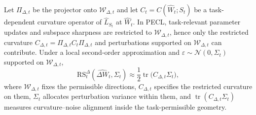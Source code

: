\documentclass{article}
\theoremstyle{plain}
\theoremstyle{definition}
\theoremstyle{remark}
\begin{document}
Let $\Pi_{\Delta,t}$ be the projector onto $\mathcal W_{\Delta,t}$ and let $C_t=C(\hat W_t;S_t)$ be a task-dependent curvature operator of $\hat L_{S_t}$ at $\widehat W_t$.
In PECL, task-relevant parameter updates and subspace sharpness are restricted to $\mathcal W_{\Delta,t}$, hence only the restricted curvature $C_{\Delta,t}=\Pi_{\Delta,t}C_t\Pi_{\Delta,t}$ and perturbations supported on $\mathcal W_{\Delta,t}$ can contribute.
Under a local second-order approximation and $\varepsilon\sim\mathcal N(0,\Sigma_t)$ supported on $\mathcal W_{\Delta,t}$,
{%
\[
\mathrm{RS}_t^{\Delta}(\widehat{\Delta W}_t,\Sigma_t)
\approx
\frac12\operatorname{tr}\!\big(C_{\Delta,t}\Sigma_t\big),
\]
}where $\mathcal W_{\Delta,t}$ fixes the permissible directions, $C_{\Delta,t}$ specifies the restricted curvature on them, $\Sigma_t$ allocates perturbation variance within them, and $\operatorname{tr}(C_{\Delta,t}\Sigma_t)$ measures curvature–noise alignment inside the task-permissible geometry.
\end{document}
